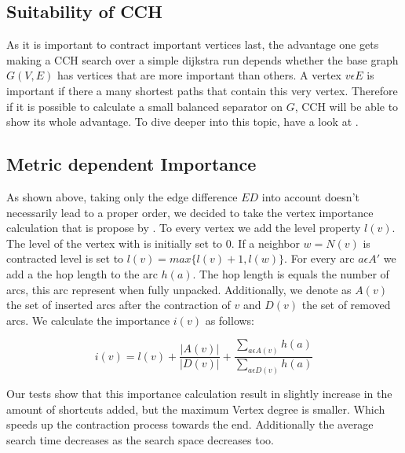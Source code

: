 \subsection{Suitability of CCH}

As it is important to contract important vertices last, the advantage one gets making a CCH search over a simple dijkstra run depends whether the base graph $G(V, E)$ has vertices that are more important than others. 
A vertex $v \epsilon E$ is important if there a many shortest paths that contain this very vertex. Therefore if it is possible to calculate a small balanced separator on $G$, CCH will be able to show its 
whole advantage. To dive deeper into this topic, have a look at \cite[Lower Bounds and Approximation Algorithms for Search Space Sizes in Contraction Hierarchies]{BlumStorandt}.

\subsection{Metric dependent Importance}

As shown above, taking only the edge difference $ED$ into account doesn't necessarily lead to a proper order, we decided to take the vertex importance calculation that is propose by \cite[Customization Contraction Hierarchies]{CCH}. To every 
vertex we add the level property $l(v)$. The level of the vertex with is initially set to $0$. If a neighbor $w = N(v)$ is contracted level is set to $l(v) = max\{l(v)+1, l(w)\}$. For every arc $a \epsilon A'$
we add a the hop length to the arc $h(a)$. The hop length is equals the number of arcs, this arc represent when fully unpacked. Additionally, we denote as $A(v)$ the set of inserted arcs after the contraction
of $v$ and $D(v)$ the set of removed arcs. We calculate the importance $i(v)$ as follows:

\begin{equation*}
    i(v) = l(v) + \frac{|A(v)|}{|D(v)|} + \frac{\sum_{a \epsilon A(v)} h(a)}{\sum_{a \epsilon D(v)} h(a)} 
\end{equation*}

Our tests show that this importance calculation result in slightly increase in the amount of shortcuts added, but the maximum Vertex degree is smaller. Which speeds up the contraction process towards the end. Additionally
the average search time decreases as the search space decreases too. 

% 

